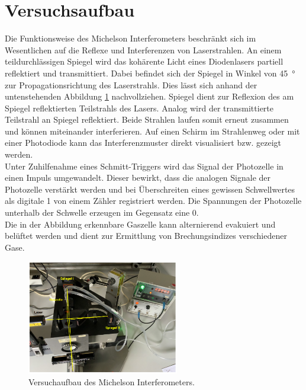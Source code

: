 


\section{Versuchsaufbau}

Die Funktionsweise des Michelson Interferometers beschränkt sich  im Wesentlichen auf die Reflexe und Interferenzen 
von Laserstrahlen. An einem teildurchlässigen Spiegel wird das kohärente Licht eines Diodenlasers partiell reflektiert 
und transmittiert. Dabei befindet sich der Spiegel in Winkel von \qty{45}{\degree} zur Propagationsrichtung des Laserstrahls.
Dies lässt sich anhand der untenstehenden Abbildung \ref{fig:Aufbau} nachvollziehen. Spiegel  dient zur Reflexion des 
am Spiegel reflektierten Teilstrahls des Lasers. Analog wird der transmittierte Teilstrahl an Spiegel  reflektiert.
Beide Strahlen laufen somit erneut zusammen und können miteinander interferieren. Auf einen Schirm im Strahlenweg oder mit einer
Photodiode kann das Interferenzmuster direkt visualisiert bzw. gezeigt werden.\\

\noindent Unter Zuhilfenahme eines Schmitt-Triggers wird das Signal der Photozelle in einen Impuls umgewandelt. Dieser bewirkt,
dass die analogen Signale der Photozelle verstärkt werden und bei Überschreiten eines gewissen Schwellwertes als digitale 1 von 
einem Zähler registriert werden. Die Spannungen der Photozelle unterhalb der Schwelle erzeugen im Gegensatz eine 0.\\

\noindent Die in der Abbildung erkennbare Gaszelle kann alternierend evakuiert und belüftet werden und dient zur Ermittlung 
von Brechungsindizes verschiedener Gase.

\begin{figure}[H]
    \centering
    \includegraphics[height=5cm]{Aufbau.png}
    \caption{Versuchaufbau des Michelson Interferometers\cite{Versuchsanleitung_v401}.}
    \label{fig:Aufbau}
\end{figure}

